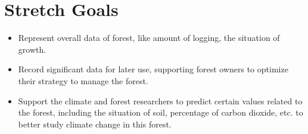 \documentclass{article}
\begin{document}
\section{Stretch Goals}

\begin{itemize}
    \item Represent overall data of forest, like amount of logging, the situation of growth.
    \item Record significant data for later use, supporting forest owners to optimize their strategy to manage the forest.
    \item Support the climate and forest researchers to predict certain values related to the forest, including the situation of 
    soil, percentage of carbon dioxide, etc. to better study climate change in this forest.

\end{itemize}
\end{document}
